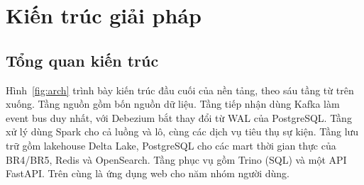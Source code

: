 \chapter{Kiến trúc giải pháp}
\label{chap:architecture}

\section{Tổng quan kiến trúc}

Hình~\ref{fig:arch} trình bày kiến trúc đầu cuối của nền tảng, theo sáu tầng từ trên xuống. Tầng nguồn gồm bốn nguồn dữ liệu. Tầng tiếp nhận dùng Kafka làm event bus duy nhất, với Debezium bắt thay đổi từ WAL của PostgreSQL. Tầng xử lý dùng Spark cho cả luồng và lô, cùng các dịch vụ tiêu thụ sự kiện. Tầng lưu trữ gồm lakehouse Delta Lake, PostgreSQL cho các mart thời gian thực của BR4/BR5, Redis và OpenSearch. Tầng phục vụ gồm Trino (SQL) và một API FastAPI. Trên cùng là ứng dụng web cho năm nhóm người dùng.

